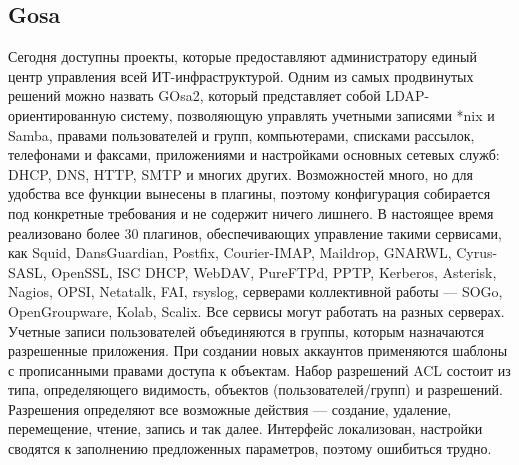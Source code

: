 \subsection{Gosa}
Сегодня доступны проекты, которые предоставляют администратору единый центр управления всей ИТ-инфраструктурой. Одним из самых продвинутых решений можно назвать GOsa2, который представляет собой LDAP-ориентированную систему, позволяющую управлять учетными записями *nix и Samba, правами пользователей и групп, компьютерами, списками рассылок, телефонами и факсами, приложениями и настройками основных сетевых служб: DHCP, DNS, HTTP, SMTP и многих других.
Возможностей много, но для удобства все функции вынесены в плагины, поэтому конфигурация собирается под конкретные требования и не содержит ничего лишнего. В настоящее время реализовано более 30 плагинов, обеспечивающих управление такими сервисами, как Squid, DansGuardian, Postfix, Courier-IMAP, Maildrop, GNARWL, Cyrus-SASL, OpenSSL, ISC DHCP, WebDAV, PureFTPd, PPTP, Kerberos, Asterisk, Nagios, OPSI, Netatalk, FAI, rsyslog, серверами коллективной работы — SOGo, OpenGroupware, Kolab, Scalix. Все сервисы могут работать на разных серверах.
Учетные записи пользователей объединяются в группы, которым назначаются разрешенные приложения. При создании новых аккаунтов применяются шаблоны с прописанными правами доступа к объектам. Набор разрешений ACL состоит из типа, определяющего видимость, объектов (пользователей/групп) и разрешений. Разрешения определяют все возможные действия — создание, удаление, перемещение, чтение, запись и так далее. Интерфейс локализован, настройки сводятся к заполнению предложенных параметров, поэтому ошибиться трудно.
